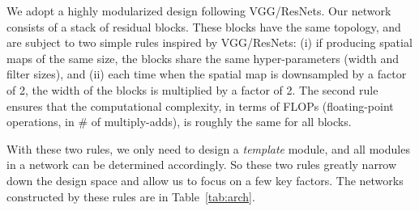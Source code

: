 \documentclass[10pt,twocolumn,letterpaper]{article}
\begin{document}
We adopt a highly modularized design following VGG/ResNets. Our network consists of a stack of residual blocks. These blocks have the same topology, and are subject to two simple rules inspired by VGG/ResNets: (i) if producing spatial maps of the same size, the blocks share the same hyper-parameters (width and filter sizes), and (ii) each time when the spatial map is downsampled by a factor of 2, the width of the blocks is multiplied by a factor of 2. The second rule ensures that the computational complexity, in terms of FLOPs (floating-point operations, in \# of multiply-adds), is roughly the same for all blocks.

With these two rules, we only need to design a \emph{template} module, and all modules in a network can be determined accordingly. So these two rules greatly narrow down the design space and allow us to focus on a few key factors.
The networks constructed by these rules are in Table~\ref{tab:arch}.

\newcommand{\blockb}[3]{\multirow{3}{*}{
\(\left[
\begin{array}{l}
\text{1$\times$1, #2}\\
[-.1em] \text{3$\times$3, #2}\\
[-.1em] \text{1$\times$1, #1}
\end{array}\right]\)$\times$#3}
}

\newcommand{\blockx}[3]{\multirow{3}{*}{
\(\left[
\begin{array}{l}
\text{1$\times$1, #2}\\
[-.1em] \text{3$\times$3, #2, $C$=32}\\
[-.1em] \text{1$\times$1, #1}\\
\end{array}\right]\)$\times$#3}
}
\end{document}
